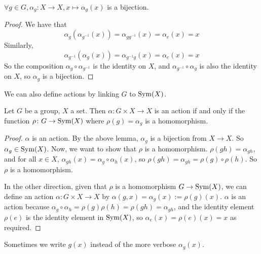 \begin{lemma}
	\(\forall g \in G, \alpha_g: X \to X, x \mapsto \alpha_g(x)\) is a bijection.
\end{lemma}
\begin{proof}
	We have that
	\[\alpha_g(\alpha_{g^{-1}}(x)) = \alpha_{g g^{-1}}(x) = \alpha_e(x) = x\]
	Similarly,
	\[\alpha_{g^{-1}}(\alpha_g(x)) = \alpha_{g^{-1} g}(x) = \alpha_e(x) = x\]
	So the composition \(\alpha_g \circ \alpha_{g^{-1}}\) is the identity on \(X\), and \(\alpha_{g^{-1}} \circ \alpha_g\) is also the identity on \(X\), so \(\alpha_g\) is a bijection.
\end{proof}
We can also define actions by linking \(G\) to \(\operatorname{Sym}(X)\).
\begin{proposition}
	Let \(G\) be a group, \(X\) a set.
	Then \(\alpha\colon G \times X \to X\) is an action if and only if the function \(\rho\colon G \to \operatorname{Sym}(X)\) where \(\rho(g) = \alpha_g\) is a homomorphism.
\end{proposition}
\begin{proof}
	\(\alpha\) is an action.
	By the above lemma, \(\alpha_g\) is a bijection from \(X \to X\).
	So \(\alpha_g \in \operatorname{Sym}(X)\).
	Now, we want to show that \(\rho\) is a homomorphism.
	\(\rho(gh) = \alpha_{gh}\), and for all \(x \in X\), \(\alpha_{gh}(x) = \alpha_g \circ \alpha_h (x)\), so \(\rho(gh) = \alpha_{gh} = \rho(g)\circ\rho(h)\).
	So \(\rho\) is a homomorphism.

	In the other direction, given that \(\rho\) is a homomorphism \(G \to \operatorname{Sym}(X)\), we can define an action \(\alpha\colon G \times X \to X\) by \(\alpha(g, x) = \alpha_g(x) := \rho(g)(x)\).
	\(\alpha\) is an action because \(\alpha_g \circ \alpha_h = \rho(g)\rho(h) = \rho(gh) = \alpha_{gh}\), and the identity element \(\rho(e)\) is the identity element in \(\operatorname{Sym}(X)\), so \(\alpha_e(x) = \rho(e)(x) = x\) as required.
\end{proof}
Sometimes we write \(g(x)\) instead of the more verbose \(\alpha_g(x)\).

